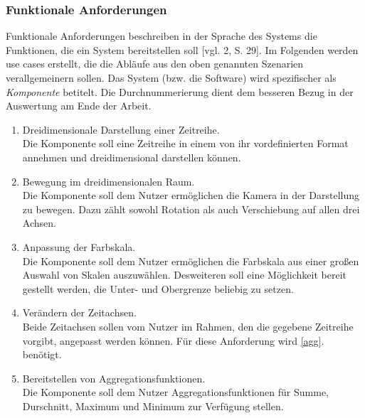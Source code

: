 \documentclass[12pt]{article}
\begin{document}
		\subsubsection{Funktionale Anforderungen}
			Funktionale Anforderungen beschreiben in der Sprache des Systems die
			Funktionen, die ein System bereitstellen soll [vgl. 2, S. 29]. Im Folgenden
			werden use cases erstellt, die die Abläufe aus den oben genannten Szenarien
			verallgemeinern sollen. Das System (bzw. die Software) wird spezifischer als
			\textit{Komponente} betitelt. Die Durchnummerierung dient dem
			besseren Bezug in der Auswertung am Ende der Arbeit.
			\begin{enumerate}
			  \item{
			  	Dreidimensionale Darstellung einer Zeitreihe.\\[0.2cm]
			  	Die Komponente soll eine Zeitreihe in einem von ihr vordefinierten
			  	Format annehmen und dreidimensional darstellen können.}
			  \item{
			  	Bewegung im dreidimensionalen Raum.\\[0.2cm]
			  	Die Komponente soll dem Nutzer ermöglichen die Kamera in der Darstellung
			  	zu bewegen. Dazu zählt sowohl Rotation als auch Verschiebung auf allen
			  	drei Achsen.}
			  \item{
			  	Anpassung der Farbskala.\\[0.2cm]
			  	Die Komponente soll dem Nutzer ermöglichen die Farbskala aus einer großen
			  	Auswahl von Skalen auszuwählen. Desweiteren soll eine Möglichkeit bereit
			  	gestellt werden, die Unter- und Obergrenze beliebig zu setzen.}
			  \item{
			  	Verändern der Zeitachsen.\\[0.2cm]
			  	Beide Zeitachsen sollen vom Nutzer im Rahmen, den die gegebene Zeitreihe
			  	vorgibt, angepasst werden können. Für diese Anforderung wird \ref{agg}.
			  	benötigt.}
			  \item{\label{agg}
			  	Bereitstellen von Aggregationsfunktionen.\\[0.2cm]
			  	Die Komponente soll dem Nutzer Aggregationsfunktionen für Summe,
			  	Durschnitt, Maximum und Minimum zur Verfügung stellen.}
			\end{enumerate}
		\newpage	
\end{document}
